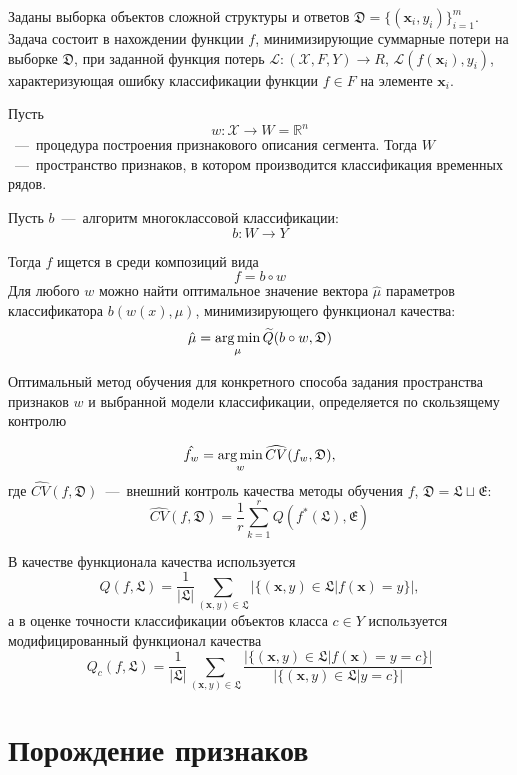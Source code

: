 \documentclass[12pt, twoside]{article}
\begin{document}
Заданы выборка объектов сложной структуры и ответов $\mathfrak{D}=\{(\mathbf{x}_i,y_i)\}_{i=1}^m$. Задача состоит в нахождении функции $f$, минимизирующие суммарные потери на выборке $\mathfrak{D}$, при заданной функция потерь $\mathscr{L}:(\mathcal{X},F,Y)\rightarrow R$, $\mathscr{L}(f(\mathbf{x}_i),y_i)$, характеризующая ошибку классификации функции $f\in F$ на элементе $\mathbf{x}_i$. 

Пусть $$w:\mathcal{X}\rightarrow W = \mathds{R}^n$$~---~процедура построения признакового описания сегмента. Тогда $W$~---~пространство признаков, в котором производится классификация временных рядов.

Пусть $b$~---~алгоритм многоклассовой классификации: 
\begin{equation}\label{classif}
b:W\rightarrow Y
\end{equation}

Тогда $f$ ищется в среди композиций вида 
$$f=b\circ w$$
Для любого $w$ можно найти оптимальное значение вектора $\hat\mu$ параметров классификатора $b(w(x),\mu)$, минимизирующего функционал качества: 
\begin{equation}\label{func_loss}
\hat\mu=\argmin_\mu \widetilde{Q}(b\circ w,\mathfrak{D})
\end{equation}

Оптимальный метод обучения для конкретного способа задания пространства признаков $w$ и выбранной модели классификации, определяется по скользящему контролю

$$\hat{f_{w}}=\argmin\limits_{w}\widehat{CV}(f_{w},\mathfrak{D}),$$ 
где $\widehat{CV}(f,\mathfrak{D})$~---~внешний контроль качества методы обучения $f$, $\mathfrak{D}=\mathfrak{L}\sqcup\mathfrak{E}$:
 \begin{equation}\label{CV}
\widehat{CV}(f, \mathfrak{D})=\frac{1}{r}\sum\limits_{k=1}^r Q(f^*(\mathfrak{L}),\mathfrak{E})
\end{equation}

В качестве функционала качества используется 
$$Q(f,\mathfrak{L})=\frac{1}{|\mathfrak{L}|}\sum\limits_{(\mathbf{x},y)\in\mathfrak{L}}|\{(\mathbf{x},y)\in\mathfrak{L}|f(\mathbf{x})=y\}|,$$ 
а в оценке точности классификации объектов класса $c\in Y$ используется модифицированный функционал качества 
$$Q_c(f,\mathfrak{L})=\frac{1}{|\mathfrak{L}|}\sum\limits_{(\mathbf{x},y)\in\mathfrak{L}}\frac{|\{(\mathbf{x},y)\in\mathfrak{L}|f(\mathbf{x})=y=c\}|}{|\{(\mathbf{x},y)\in\mathfrak{L}|y=c\}|}$$


\section{Порождение признаков}
\end{document}

